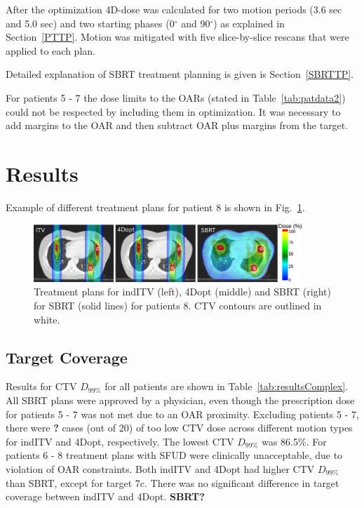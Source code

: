 \documentclass[type=dr, dr=rernat, accentcolor=tud7b,colorbacktitle, bigchapter, openright, twoside, 12pt ]{tudthesis}
\begin{document}
After the optimization 4D-dose was calculated for two motion periods (3.6 sec and 5.0 sec) and two starting phases (0$^\circ$ and 90$^\circ$) as explained in Section~\ref{PTTP}. Motion was mitigated with five 
slice-by-slice rescans that were applied to each plan.

Detailed explanation of SBRT treatment planning is given is Section~\ref{SBRTTP}.

For patients 5 - 7 the dose limits to the OARs (stated in Table~\ref{tab:patdata2}) could not be respected by including them in optimization. It was necessary to add margins to the OAR and then 
subtract OAR plus margins from the target.

\section{Results}

Example of different treatment plans for patient 8 is shown in Fig.~\ref{Fig:multiExample}.

\begin{figure}[H]
	\begin{center}
		\includegraphics[width=0.9\textwidth]{./Images/multiExample.png}
		\caption{Treatment plans for indITV (left), 4Dopt (middle) and SBRT (right) for SBRT (solid lines) for patients 8. CTV contours are outlined in white.}
		\label{Fig:multiExample}
	\end{center}
\end{figure}

\subsection{Target Coverage}

Results for CTV $D_{99\%}$ for all patients are shown in Table~\ref{tab:resultsComplex}. All SBRT plans were approved by a physician, 
even though the prescription dose for patients 5 - 7 was not met due to an OAR proximity. Excluding patients 5 - 7, there were \textbf{?} cases (out of 20) of too low CTV dose across different
motion types for indITV and 4Dopt, respectively. The lowest CTV $D_{99\%}$ was 86.5\%.
For patients 6 - 8 treatment plans with SFUD were clinically unacceptable, due to violation of OAR constraints. Both indITV and 4Dopt had higher CTV $D_{99\%}$ than SBRT, except for target 7c.
There was no significant difference in target coverage between indITV and 4Dopt. \textbf{SBRT?}
\end{document}
